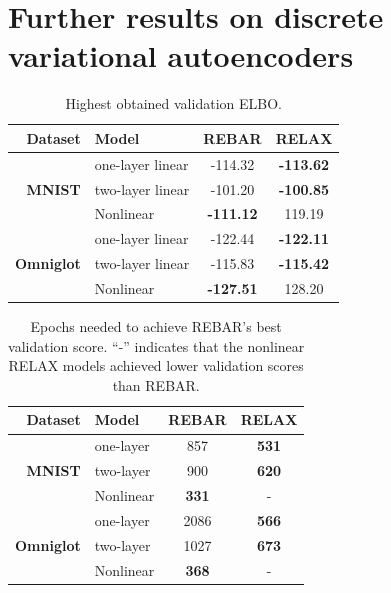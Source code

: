\documentclass{article}
\begin{document}
\section{Further results on discrete variational autoencoders}
\label{extra vae results}

\begin{table}[h]
\centering
\begin{tabular}{r l | c c} 
  Dataset & Model & REBAR & RELAX \\\midrule
 & one-layer linear  & -114.32 & \textbf{-113.62} \\ 
\textbf{MNIST} & two-layer linear  & -101.20 & \textbf{-100.85}\\
& Nonlinear & \textbf{-111.12} & 119.19 \\ \midrule
 & one-layer linear & -122.44 & \textbf{-122.11} \\ 
\textbf{Omniglot}& two-layer linear & -115.83 & \textbf{-115.42}\\
& Nonlinear& \textbf{-127.51} & 128.20
\end{tabular}
\caption{Highest obtained validation ELBO.}
\label{tab:vae val}
\end{table}


\begin{table}[h]
\centering
\begin{tabular}{r l | c c} 
 Dataset & Model  & REBAR & RELAX \\\midrule
 & one-layer  & 857 & \textbf{531} \\ 
\textbf{MNIST} & two-layer  & 900 & \textbf{620} \\
& Nonlinear & \textbf{331} & - \\
\midrule
& one-layer & 2086 & \textbf{566} \\ 
\textbf{Omniglot}  & two-layer & 1027 & \textbf{673}\\
& Nonlinear & \textbf{368} & - 
\end{tabular}
\caption{Epochs needed to achieve REBAR's best validation score. ``-'' indicates that the nonlinear RELAX models achieved lower validation scores than REBAR.}
\label{tab:vae epochs}
\end{table}
\end{document}
